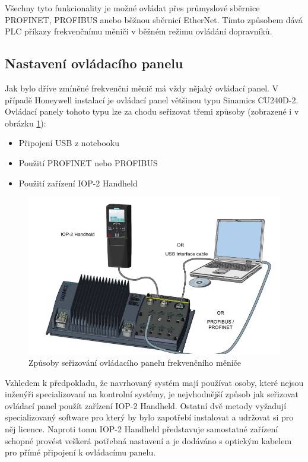 Všechny tyto funkcionality je možné ovládat přes průmyslové sběrnice PROFINET, PROFIBUS anebo běžnou sběrnicí EtherNet. Tímto způsobem dává PLC příkazy frekvenčnímu měniči v běžném režimu ovládání dopravníků.

\subsection{Nastavení ovládacího panelu}\label{sec:NastaveniOvladacihoPanelu}

Jak bylo dříve zmíněné frekvenční měnič má vždy nějaký ovládací panel. V případě Honeywell instalací je ovládací panel většinou typu Sinamics CU240D-2. Ovládací panely tohoto typu lze za chodu seřizovat třemi způsoby (zobrazené i v obrázku \ref{fig:cu240comissioning}):
\begin{itemize}
	\item Připojení USB z notebooku
	\item Použití PROFINET nebo PROFIBUS
	\item Použití zařízení IOP-2 Handheld
\end{itemize}

\begin{figure}[hptb]
	\centering
	\includegraphics[width=0.7\linewidth]{images/CU240comissioning}
	\caption{Způsoby seřizování ovládacího panelu frekvenčního měniče \cite{SiemensG120DGettingStarted}}
	\label{fig:cu240comissioning}
\end{figure}

Vzhledem k předpokladu, že navrhovaný systém mají používat osoby, které nejsou inženýři specializovaní na kontrolní systémy, je nejvhodnější způsob jak seřizovat ovládací panel použít zařízení IOP-2 Handheld. Ostatní dvě metody vyžadují specializovaný software pro který by bylo zapotřebí instalovat a udržovat si pro něj licence. Naproti tomu IOP-2 Handheld představuje samostatné zařízení schopné provést veškerá potřebná nastavení a je dodáváno s optickým kabelem pro přímé připojení k ovládacímu panelu.

